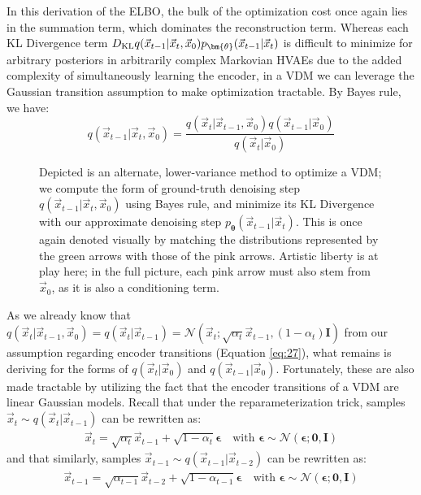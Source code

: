 In this derivation of the ELBO, the bulk of the optimization cost once again lies in the summation term, which dominates the reconstruction term.  Whereas each KL Divergence term $D_{\rm{KL}}{q(\vec{x}_{t-1}|\vec{x}_t, \vec{x}_0)}{p_{\bm{\theta}}(\vec{x}_{t-1}|\vec{x}_t)}$ is difficult to minimize for arbitrary posteriors in arbitrarily complex Markovian HVAEs due to the added complexity of simultaneously learning the encoder, in a VDM we can leverage the Gaussian transition assumption to make optimization tractable.  By Bayes rule, we have:
$$q(\vec{x}_{t-1}|\vec{x}_t, \vec{x}_0) = \frac{q(\vec{x}_t | \vec{x}_{t-1}, \vec{x}_0)q(\vec{x}_{t-1}|\vec{x}_0)}{q(\vec{x}_{t}|\vec{x}_0)}$$
\begin{figure}
  \centering
  \caption{Depicted is an alternate, lower-variance method to optimize a VDM; we compute the form of ground-truth denoising step $q(\vec{x}_{t-1}|\vec{x}_t, \vec{x}_0)$ using Bayes rule, and minimize its KL Divergence with our approximate denoising step $p_{\bm{\theta}}(\vec{x}_{t-1}|\vec{x}_t)$.  This is once again denoted visually by matching the distributions represented by the green arrows with those of the pink arrows.  Artistic liberty is at play here; in the full picture, each pink arrow must also stem from $\vec{x}_0$, as it is also a conditioning term.}
  \label{fig:second_deriv}
\end{figure}As we already know that $q(\vec{x}_t | \vec{x}_{t-1}, \vec{x}_0) = q(\vec{x}_t | \vec{x}_{t-1}) = \mathcal{N}(\vec{x}_{t} ; \sqrt{\alpha_t} \vec{x}_{t-1}, (1 - \alpha_t)\textbf{I})$ from our assumption regarding encoder transitions (Equation \ref{eq:27}), what remains is deriving for the forms of $q(\vec{x}_t|\vec{x}_0)$ and $q(\vec{x}_{t-1}|\vec{x}_0)$.  Fortunately, these are also made tractable by utilizing the fact that the encoder transitions of a VDM are linear Gaussian models.  Recall that under the reparameterization trick, samples $\vec{x}_t \sim q(\vec{x}_t | \vec{x}_{t-1})$ can be rewritten as:
\begin{align}
    \vec{x}_t = \sqrt{\alpha_t}\vec{x}_{t-1} + \sqrt{1 - \alpha_t}\bm{\epsilon} \quad \text{with } \bm{\epsilon} \sim \mathcal{N}(\bm{\epsilon}; \bm{0}, \textbf{I})
\end{align}
and that similarly, samples $\vec{x}_{t-1} \sim q(\vec{x}_{t-1} | \vec{x}_{t-2})$ can be rewritten as:
\begin{align}
    \vec{x}_{t-1} = \sqrt{\alpha_{t-1}}\vec{x}_{t-2} + \sqrt{1 - \alpha_{t-1}}\bm{\epsilon} \quad \text{with } \bm{\epsilon} \sim \mathcal{N}(\bm{\epsilon}; \bm{0}, \textbf{I})
\end{align}
